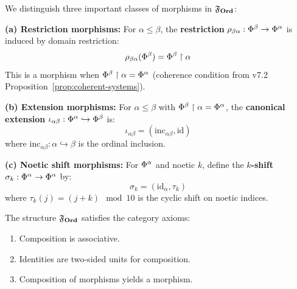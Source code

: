 \begin{definition}
\label{def:special-morphisms}
We distinguish three important classes of morphisms in $\mathfrak{F}_{\mathbf{Ord}}$:

\textbf{(a) Restriction morphisms:} For $\alpha \leq \beta$, the \textbf{restriction} $\rho_{\beta\alpha} : \Phi^{\beta} \to \Phi^{\alpha}$ is induced by domain restriction:
\[
\rho_{\beta\alpha}(\Phi^{\beta}) = \Phi^{\beta} \restriction \alpha
\]
This is a morphism when $\Phi^{\beta} \restriction \alpha = \Phi^{\alpha}$ (coherence condition from v7.2 Proposition~\ref*{prop:coherent-systems}).

\textbf{(b) Extension morphisms:} For $\alpha \leq \beta$ with $\Phi^{\beta} \restriction \alpha = \Phi^{\alpha}$, the \textbf{canonical extension} $\iota_{\alpha\beta} : \Phi^{\alpha} \hookrightarrow \Phi^{\beta}$ is:
\[
\iota_{\alpha\beta} = (\mathrm{inc}_{\alpha\beta}, \mathrm{id})
\]
where $\mathrm{inc}_{\alpha\beta} : \alpha \hookrightarrow \beta$ is the ordinal inclusion.

\textbf{(c) Noetic shift morphisms:} For $\Phi^{\alpha}$ and noetic $k$, define the \textbf{$k$-shift} $\sigma_k : \Phi^{\alpha} \to \Phi^{\alpha}$ by:
\[
\sigma_k = (\mathrm{id}_\alpha, \tau_k)
\]
where $\tau_k(j) = (j + k) \mod 10$ is the cyclic shift on noetic indices.
\end{definition}

\begin{lemma}
\label{lem:ordfrac-welldef}
The structure $\mathfrak{F}_{\mathbf{Ord}}$ satisfies the category axioms:
\begin{enumerate}[label=(\roman*)]
  \item Composition is associative.
  \item Identities are two-sided units for composition.
  \item Composition of morphisms yields a morphism.
\end{enumerate}
\end{lemma}

